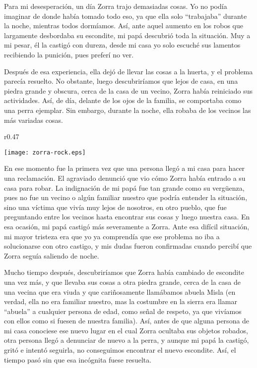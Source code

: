 Para mi desesperación, un día Zorra trajo demasiadas cosas. Yo no podía imaginar de donde había tomado todo eso, ya que ella solo ``trabajaba'' durante la noche, mientras todos dormíamos. Así, ante aquel aumento en los robos que largamente desbordaba su escondite, mi papá descubrió toda la situación.
Muy a mi pesar, él la castigó con dureza, desde mi casa yo solo escuché sus lamentos recibiendo la punición, pues preferí no ver.


Después de esa experiencia, ella dejó de llevar las cosas a la huerta, y el problema parecía resuelto. No obstante, luego descubriríamos que lejos de casa, en una piedra grande y obscura, cerca de la casa de un vecino, 
Zorra había reiniciado sus actividades. Así, de día, delante de los ojos de la familia, se comportaba como una perra ejemplar. Sin embargo, durante la noche, ella robaba de los vecinos las más variadas cosas.

\ifdefined\EnableIncludeImages
\begin{wrapfigure}{r}{0.47\textwidth}
  \begin{center}
    \texttt{[image: zorra-rock.eps]}
  \end{center}
  \vspace{-10pt}
\end{wrapfigure}
\fi
En ese momento fue la primera vez que una persona llegó a mi casa para hacer una reclamación. El agraviado denunció que vio cómo Zorra había entrado a su casa para robar.
La indignación de mi papá fue tan grande como su vergüenza, pues no fue un vecino o algún familiar nuestro que podría entender la situación, sino una víctima que vivía muy lejos de nosotros, en otro pueblo, que fue preguntando entre los vecinos hasta encontrar sus cosas y luego nuestra casa.
En esa ocasión, mi papá castigó más severamente a Zorra. Ante esa difícil situación, mi mayor tristeza era que yo ya comprendía que ese problema no iba a solucionarse con otro castigo, y mis dudas fueron confirmadas cuando percibí que Zorra seguía saliendo de noche.

Mucho tiempo después, descubriríamos que Zorra había cambiado de escondite una vez más, y que llevaba sus cosas a otra piedra grande, cerca de la casa de una vecina que era viuda y que cariñosamente llamábamos abuela Misla (en verdad, ella no era familiar nuestro, mas la costumbre en la sierra era llamar ``abuela'' a cualquier persona de edad, como señal de respeto, ya que vivíamos con ellos como si fuesen de nuestra familia).
Así, antes de que alguna persona de mi casa conociese ese nuevo lugar en el cual Zorra ocultaba sus objetos robados, otra persona llegó a denunciar de nuevo a la perra, y aunque mi papá la castigó, gritó e intentó seguirla, no conseguimos encontrar el nuevo escondite. Así, el tiempo pasó sin que esa incógnita fuese resuelta.

